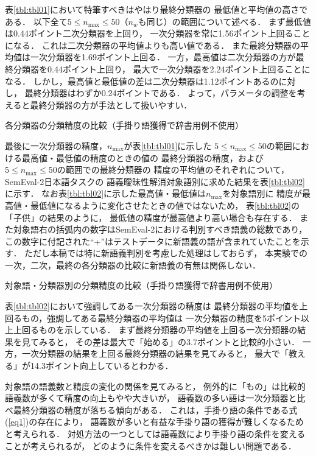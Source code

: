 \documentclass[japanese]{jnlp_1.4}
\begin{document}
表\ref{tbl:tbl01}において特筆すべきはやはり最終分類器の
最低値と平均値の高さである．
以下全て$5 \leq n_{\max} \leq 50$（$n_w$も同じ）の範囲について述べる．
まず最低値は0.44ポイント二次分類器を上回り，
一次分類器を常に1.56ポイント上回ることになる．
これは二次分類器の平均値よりも高い値である．
また最終分類器の平均値は一次分類器を1.69ポイント上回る．
一方，最高値は二次分類器の方が最終分類器を0.44ポイント上回り，
最大で一次分類器を2.24ポイント上回ることになる．
しかし，最高値と最低値の差は二次分類器は1.12ポイントあるのに対し，
最終分類器はわずか0.24ポイントである．
よって，パラメータの調整を考えると最終分類器の方が手法として扱いやすい．

\begin{table}[t]
\caption{各分類器の分類精度の比較（手掛り語獲得で辞書用例不使用）}
\label{tbl:tbl01}

\end{table}

最後に一次分類器の精度，$n_{\max}$が表\ref{tbl:tbl01}に示した
$5 \leq n_{\max} \leq 50$の範囲における最高値・最低値の精度のときの値の
最終分類器の精度，および$5 \leq n_{\max} \leq 50$の範囲での最終分類器の
精度の平均値のそれぞれについて，SemEval-2日本語タスクの
語義曖昧性解消対象語別に求めた結果を表\ref{tbl:tbl02}に示す．
なお表\ref{tbl:tbl02}に示した最高値・最低値は$n_{\max}$を対象語別に
精度が最高値・最低値になるように変化させたときの値ではないため，
表\ref{tbl:tbl02}の「子供」の結果のように，
最低値の精度が最高値より高い場合も存在する．
また対象語右の括弧内の数字はSemEval-2における判別すべき語義の総数であり，
この数字に付記された``+''はテストデータに新語義の語が含まれていたことを示す．
ただし本稿では特に新語義判別を考慮した処理はしておらず，
本実験での一次，二次，最終の各分類器の比較に新語義の有無は関係しない．

\begin{table}[t]
\caption{対象語・分類器別の分類精度の比較（手掛り語獲得で辞書用例不使用）}
\label{tbl:tbl02}

\end{table}

表\ref{tbl:tbl02}において強調してある一次分類器の精度は
最終分類器の平均値を上回るもの，強調してある最終分類器の平均値は
一次分類器の精度を5ポイント以上上回るものを示している．
まず最終分類器の平均値を上回る一次分類器の結果を見てみると，
その差は最大で「始める」の3.7ポイントと比較的小さい．
一方，一次分類器の結果を上回る最終分類器の結果を見てみると，
最大で「教える」が14.3ポイント向上しているとわかる．

対象語の語義数と精度の変化の関係を見てみると，
例外的に「もの」は比較的語義数が多くて精度の向上もやや大きいが，
語義数の多い語は一次分類器と比べ最終分類器の精度が落ちる傾向がある．
これは，手掛り語の条件である式(\ref{eq1})の存在により，
語義数が多いと有益な手掛り語の獲得が難しくなるためと考えられる．
対処方法の一つとしては語義数により手掛り語の条件を変えることが考えられるが，
どのように条件を変えるべきかは難しい問題である．
\end{document}
